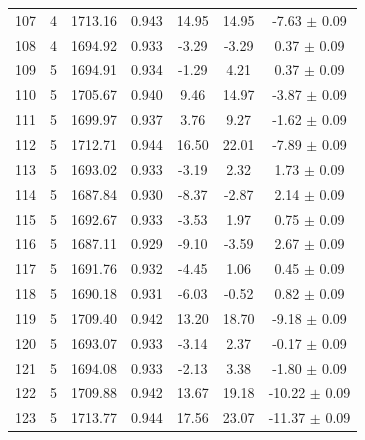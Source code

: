 \begin{longtable}{c c c c c c c}
    107 & 4 & 1713.16 & 0.943 & \cellcolor{aicred}14.95 & \cellcolor{aicred}14.95 & \cellcolor{aicred}-7.63 $\pm$ 0.09 \\
    108 & 4 & 1694.92 & 0.933 & \cellcolor{aiclightyellow}-3.29 & \cellcolor{aiclightyellow}-3.29 & 0.37 $\pm$ 0.09 \\
    109 & 5 & 1694.91 & 0.934 & -1.29 & \cellcolor{aicorange}4.21 & 0.37 $\pm$ 0.09 \\
    110 & 5 & 1705.67 & 0.940 & \cellcolor{aiclightred}9.46 & \cellcolor{aicred}14.97 & \cellcolor{aiclightred}-3.87 $\pm$ 0.09 \\
    111 & 5 & 1699.97 & 0.937 & \cellcolor{aiclightorange}3.76 & \cellcolor{aiclightred}9.27 & \cellcolor{aicorange}-1.62 $\pm$ 0.09 \\
    112 & 5 & 1712.71 & 0.944 & \cellcolor{aicred}16.50 & \cellcolor{aicred}22.01 & \cellcolor{aicred}-7.89 $\pm$ 0.09 \\
    113 & 5 & 1693.02 & 0.933 & \cellcolor{aiclightyellow}-3.19 & \cellcolor{aiclightorange}2.32 & \cellcolor{aicyellow}1.73 $\pm$ 0.09 \\
    114 & 5 & 1687.84 & 0.930 & \cellcolor{aiclightgreen}-8.37 & \cellcolor{aiclightyellow}-2.87 & \cellcolor{aicyellow}2.14 $\pm$ 0.09 \\
    115 & 5 & 1692.67 & 0.933 & \cellcolor{aiclightyellow}-3.53 & 1.97 & 0.75 $\pm$ 0.09 \\
    116 & 5 & 1687.11 & 0.929 & \cellcolor{aiclightgreen}-9.10 & \cellcolor{aiclightyellow}-3.59 & \cellcolor{aicyellow}2.67 $\pm$ 0.09 \\
    117 & 5 & 1691.76 & 0.932 & \cellcolor{aicyellow}-4.45 & 1.06 & 0.45 $\pm$ 0.09 \\
    118 & 5 & 1690.18 & 0.931 & \cellcolor{aicyellow}-6.03 & -0.52 & 0.82 $\pm$ 0.09 \\
    119 & 5 & 1709.40 & 0.942 & \cellcolor{aicred}13.20 & \cellcolor{aicred}18.70 & \cellcolor{aicred}-9.18 $\pm$ 0.09 \\
    120 & 5 & 1693.07 & 0.933 & \cellcolor{aiclightyellow}-3.14 & \cellcolor{aiclightorange}2.37 & -0.17 $\pm$ 0.09 \\
    121 & 5 & 1694.08 & 0.933 & \cellcolor{aiclightyellow}-2.13 & \cellcolor{aiclightorange}3.38 & \cellcolor{aicorange}-1.80 $\pm$ 0.09 \\
    122 & 5 & 1709.88 & 0.942 & \cellcolor{aicred}13.67 & \cellcolor{aicred}19.18 & \cellcolor{aicred}-10.22 $\pm$ 0.09 \\
    123 & 5 & 1713.77 & 0.944 & \cellcolor{aicred}17.56 & \cellcolor{aicred}23.07 & \cellcolor{aicred}-11.37 $\pm$ 0.09 \\

\end{longtable}
